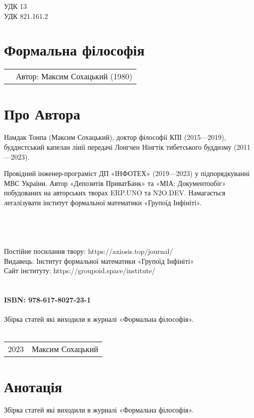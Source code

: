 \noindent УДК 13\\
УДК 821.161.2

\section*{Формальна філософія}

\begin{tabular}{ll}
& Автор: Максим Сохацький (1980)\\
\end{tabular}

\section*{Про Автора}
Намдак Тонпа (Максим Сохацький), доктор філософії КПІ (2015---2019),
буддистський капелан лінії передачі Лонгчен Нінгтік тибетського
буддизму (2011---2023).

Провідний інженер-програміст ДП «ІНФОТЕХ» (2019---2023)
у підпорядкуванні МВС України. Автор «Депозитів ПриватБанк»
та «МІА: Документообіг» побудованих на авторських творах ERP.UNO
та N2O.DEV. Намагається легалізувати інститут формальної
математики «Групоїд Інфініті».
\\
\\
\\
\\
\\
Постійне посилання твору: https://axiosis.top/journal/ \\
Видавець: Інститут формальної математики «Групоїд Інфініті» \\
Сайт інституту: https://groupoid.space/institute/ \\
\\
\\
{\bf ISBN: 978-617-8027-23-1 \hspace{2em}}
\\
\\
\small
\indent Збірка статей які виходили в журналі «Формальна філософія».
\\
\\
\begin{tabular}{ll}
\textcopyright{} 2023 & Максим Сохацький
\end{tabular}

\newpage
\section*{Анотація}

Збірка статей які виходили в журналі «Формальна філософія».

\normalsize

